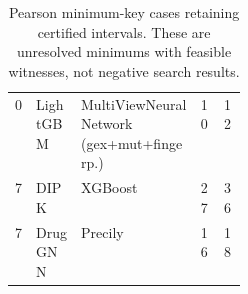 \begin{table}[htbp]
\centering\small{}
\caption{Pearson minimum-key cases retaining certified intervals. These are unresolved minimums with feasible witnesses, not negative search results.}
\begin{tabularx}{\linewidth}{@{}L{0.07\linewidth}XXN{0.10\linewidth}N{0.10\linewidth}@{}}
\toprule
{} &  &  &  & \\ & LightGBM & MultiViewNeuralNetwork (gex+mut+fingerp.) & 10 & 12\\
7 & DIPK & XGBoost & 27 & 36\\
7 & DrugGNN & Precily & 16 & 18\\
\bottomrule
\end{tabularx}
\end{table}

